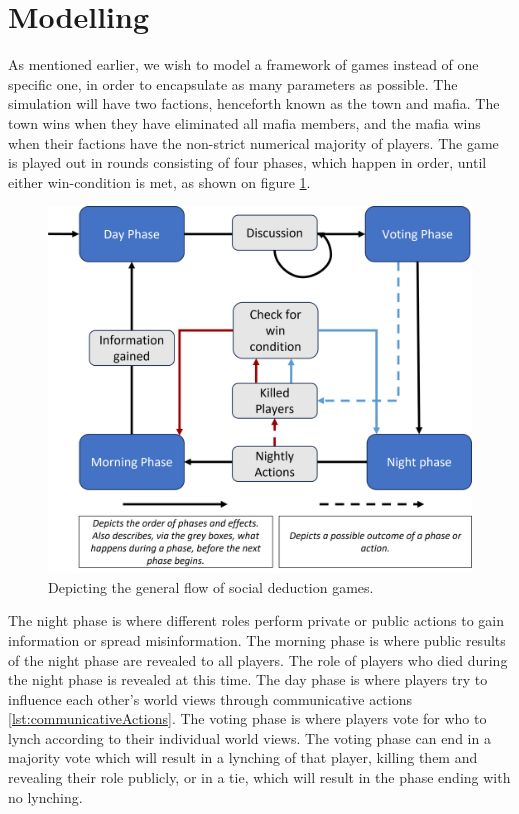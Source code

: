 \section{Modelling}
As mentioned earlier, we wish to model a framework of games instead of one
specific one, in order to encapsulate as many parameters as possible. The
simulation will have two factions, henceforth known as the town and mafia. The
town wins when they have eliminated all mafia members, and the mafia wins when
their factions have the non-strict numerical majority of players. The game is
played out in rounds consisting of four phases, which happen in order, until
either win-condition is met, as shown on figure \ref{fig:GameOverview}.
\begin{figure}[H]
	\includegraphics[width=1\linewidth]{figures/Game_overview}
	\caption{Depicting the general flow of social deduction games.}
	\label{fig:GameOverview}
\end{figure}

The night phase is where different roles perform private or public actions to
gain information or spread misinformation. The morning phase is where public
results of the night phase are revealed to all players. The role of players who
died during the night phase is revealed at this time. The day phase is where
players try to influence each other's world views through communicative actions
\ref{lst:communicativeActions}. The voting phase is where players vote for who
to lynch according to their individual world views. The voting phase can end in
a majority vote which will result in a lynching of that player, killing them
and revealing their role publicly, or in a tie, which will result in the phase
ending with no lynching.

